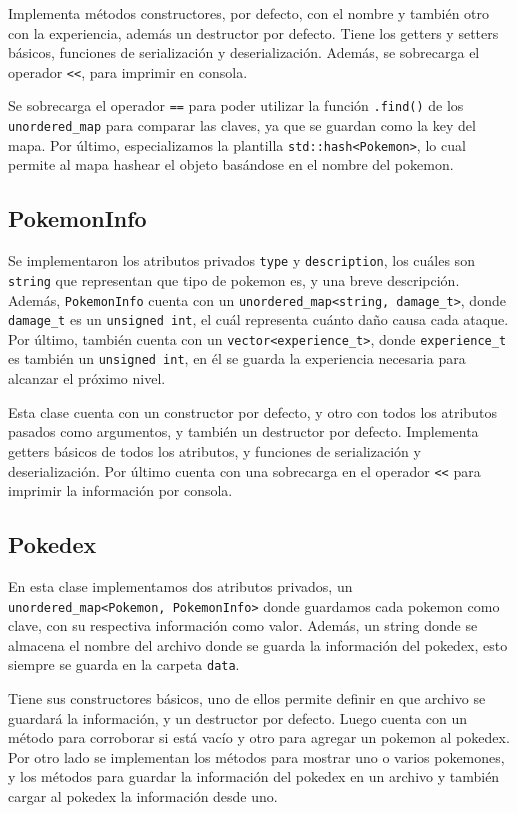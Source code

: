 \documentclass[11pt, a4paper]{article}
\begin{document}
\begin{multicols}{2}
Implementa métodos constructores, por defecto, con el nombre y también otro con la experiencia, además un destructor por defecto. Tiene los getters y setters básicos, funciones de serialización y deserialización. Además, se sobrecarga el operador \lstinline|<<|, para imprimir en consola.

Se sobrecarga el operador \lstinline|==| para poder utilizar la función \lstinline|.find()| de los \lstinline|unordered_map| para comparar las claves, ya que se guardan como la key del mapa. Por último, especializamos la plantilla \lstinline|std::hash<Pokemon>|, lo cual permite al mapa hashear el objeto basándose en el nombre del pokemon.

\subsection{PokemonInfo}

Se implementaron los atributos privados \lstinline|type| y \lstinline|description|, los cuáles son \lstinline|string| que representan que tipo de pokemon es, y una breve descripción. Además, \lstinline|PokemonInfo| cuenta con un \lstinline|unordered_map<string, damage_t>|, donde \lstinline|damage_t| es un \lstinline|unsigned int|, el cuál representa cuánto daño causa cada ataque. Por último, también cuenta con un \lstinline|vector<experience_t>|, donde \lstinline|experience_t| es también un \lstinline|unsigned int|, en él se guarda la experiencia necesaria para alcanzar el próximo nivel.

Esta clase cuenta con un constructor por defecto, y otro con todos los atributos pasados como argumentos, y también un destructor por defecto. Implementa getters básicos de todos los atributos, y funciones de serialización y deserialización. Por último cuenta con una sobrecarga en el operador \lstinline|<<| para imprimir la información por consola.

\subsection{Pokedex}

En esta clase implementamos dos atributos privados, un \lstinline|unordered_map<Pokemon, PokemonInfo>| donde guardamos cada pokemon como clave, con su respectiva información como valor. Además, un string donde se almacena el nombre del archivo donde se guarda la información del pokedex, esto siempre se guarda en la carpeta \lstinline|data|.

Tiene sus constructores básicos, uno de ellos permite definir en que archivo se guardará la información, y un destructor por defecto. Luego cuenta con un método para corroborar si está vacío y otro para agregar un pokemon al pokedex. Por otro lado se implementan los métodos para mostrar uno o varios pokemones, y los métodos para guardar la información del pokedex en un archivo y también cargar al pokedex la información desde uno.


\end{multicols}
\end{document}
